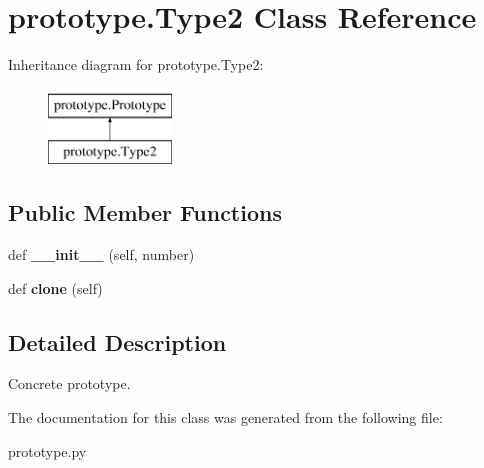 \hypertarget{classprototype_1_1_type2}{}\section{prototype.\+Type2 Class Reference}
\label{classprototype_1_1_type2}
Inheritance diagram for prototype.\+Type2\+:\begin{figure}[H]
\begin{center}
\leavevmode
\includegraphics[height=2.000000cm]{classprototype_1_1_type2}
\end{center}
\end{figure}
\subsection*{Public Member Functions}
\begin{DoxyCompactItemize}
\item 
\mbox{\label{classprototype_1_1_type2_ac5fc947194ea1fc853a77f7824199bf8}} 
def {\bfseries \+\_\+\+\_\+init\+\_\+\+\_\+} (self, number)
\item 
\mbox{\label{classprototype_1_1_type2_aaca5eda564d17f7ec59cee14dc196626}} 
def {\bfseries clone} (self)
\end{DoxyCompactItemize}


\subsection{Detailed Description}
\begin{DoxyVerb}Concrete prototype. \end{DoxyVerb}
 

The documentation for this class was generated from the following file\+:\begin{DoxyCompactItemize}
\item 
prototype.\+py\end{DoxyCompactItemize}

